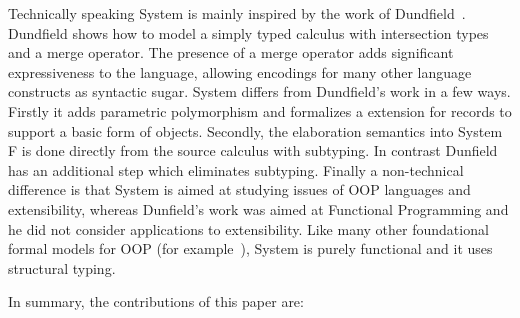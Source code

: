 Technically speaking System \name is mainly inspired by the work of
Dundfield~\cite{dunfield2014elaborating}.  Dundfield shows how to model a simply typed
calculus with intersection types and a merge operator. The presence of
a merge operator adds significant expressiveness to the language,
allowing encodings for many other language constructs as syntactic
sugar. System \name differs from Dundfield's work in a few
ways. Firstly it adds parametric polymorphism and formalizes a
extension for records to support a basic form of objects. Secondly,
the elaboration semantics into System F is done directly from the
source calculus with subtyping. In contrast Dunfield has an additional
step which eliminates subtyping.  Finally a non-technical difference
is that System \name is aimed at studying issues of OOP languages and
extensibility, whereas Dunfield's work was aimed at Functional
Programming and he did not consider applications to extensibility.
Like many other foundational formal models for OOP (for
example~\cite{}), System \name is purely functional and it uses
structural typing.


\begin{comment}
We present a polymorphic calculus containing intersection types and records, and show
how this language can be used to solve various common tasks in functional
programming in a nicer way.Intersection types provides a power mechanism for functional programming, in
particular for extensibility and allowing new forms of composition.

Prototype-based programming is one of the two major styles of object-oriented
programming, the other being class-based programming which is featured in
languages such as Java and C\#. It has gained increasing popularity recently
with the prominence of JavaScript in web applications. Prototype-based
programming supports highly dynamic behaviors at run time that are not possible
with traditional class-based programming. However, despite its flexibility,
prototype-based programming is often criticized over concerns of correctness and
safety. Furthermore, almost all prototype-based systems rely on the fact that
the language is dynamically typed and interpreted.
\end{comment}

In summary, the contributions of this paper are:

